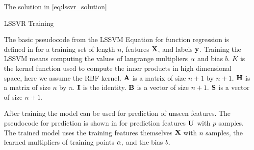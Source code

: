 The solution in \cref{eq:lssvr_solution}

\begin{algorithm}[H]
  \caption{LSSVR Training}\label{alg:lssvr_training}
  \begin{algorithmic}[1]
    \State{\(\Omega \gets [[]]\)}

    \EndFor{}
    \EndFor{}
    \EndFor{}
    \EndFor{}
    \EndFor{}
    \EndFor{}
    \EndFor{}
    \EndProcedure{}
  \end{algorithmic}
\end{algorithm}

The basic pseudocode from the LSSVM Equation for function regression is defined in  for a training set of length $n$, features $\vb{X}$, and labels $\vb{y}$. Training the LSSVM means computing the values of langrange multipliers $\vb{\alpha}$ and bias $b$. $K$ is the kernel function used to compute the inner products in high dimensional space, here we assume the RBF kernel. $\vb{A}$ is a matrix of size $n+1$ by $n+1$. $\vb{H}$ is a matrix of size $n$ by $n$. $\vb{I}$ is the identity. $\vb{B}$ is a vector of size $n+1$. $\vb{S}$ is a vector of size $n+1$.

After training the model can be used for prediction of unseen features. The pseudocode for prediction is shown in  for prediction features $\vb{U}$ with \(p \) samples. The trained model uses the training features themselves $\vb{X}$ with \(n \) samples, the learned multipliers of training points $\vb{\alpha}$, and the bias $b$.

